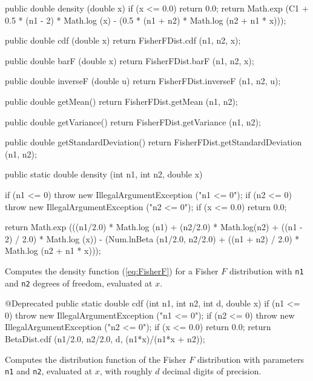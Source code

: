 \begin{code}\begin{hide}

   public double density (double x) {
      if (x <= 0.0)
         return 0.0;
      return Math.exp (C1 + 0.5 * (n1 - 2) * Math.log (x) -
           (0.5 * (n1 + n2) * Math.log (n2 + n1 * x)));
   }

   public double cdf (double x) {
      return FisherFDist.cdf (n1, n2, x);
   }

   public double barF (double x) {
      return FisherFDist.barF (n1, n2, x);
   }

   public double inverseF (double u) {
      return FisherFDist.inverseF (n1, n2, u);
   }

   public double getMean() {
      return FisherFDist.getMean (n1, n2);
   }

   public double getVariance() {
      return FisherFDist.getVariance (n1, n2);
   }

   public double getStandardDeviation() {
      return FisherFDist.getStandardDeviation (n1, n2);
   }\end{hide}

   public static double density (int n1, int n2, double x)\begin{hide} {
      if (n1 <= 0)
         throw new IllegalArgumentException ("n1 <= 0");
      if (n2 <= 0)
         throw new IllegalArgumentException ("n2 <= 0");
      if (x <= 0.0)
         return 0.0;

      return Math.exp (((n1/2.0) * Math.log (n1) + (n2/2.0) * Math.log(n2) +
          ((n1 - 2) / 2.0) * Math.log (x)) -
          (Num.lnBeta (n1/2.0, n2/2.0) + 
          ((n1 + n2) / 2.0) * Math.log (n2 + n1 * x)));
   }\end{hide}
\end{code}
\begin{tabb} Computes the density function (\ref{eq:FisherF}) for a Fisher
$F$ distribution with \texttt{n1} and \texttt{n2} degrees of freedom,
 evaluated at $x$.
\end{tabb}
\begin{hide}\begin{code}

   @Deprecated
   public static double cdf (int n1, int n2, int d, double x) {
      if (n1 <= 0)
         throw new IllegalArgumentException ("n1 <= 0");
      if (n2 <= 0)
         throw new IllegalArgumentException ("n2 <= 0");
      if (x <= 0.0)
         return 0.0;
      return BetaDist.cdf (n1/2.0, n2/2.0, d, (n1*x)/(n1*x + n2));
   }
\end{code}
\begin{tabb}
Computes the distribution function of the Fisher $F$ distribution with 
parameters \texttt{n1} and \texttt{n2}, evaluated at $x$, with roughly $d$
 decimal digits of precision.
 \end{tabb}\end{hide}
